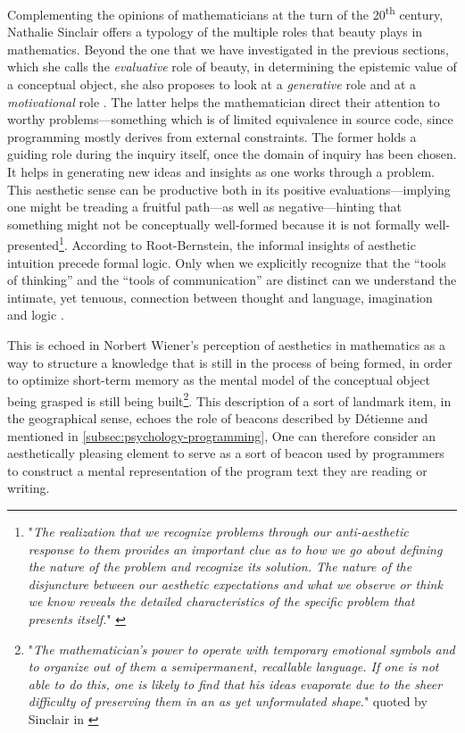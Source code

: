 Complementing the opinions of mathematicians at the turn of the 20\textsuperscript{th} century, Nathalie Sinclair offers a typology of the multiple roles that beauty plays in mathematics. Beyond the one that we have investigated in the previous sections, which she calls the \emph{evaluative} role of beauty, in determining the epistemic value of a conceptual object, she also proposes to look at a \emph{generative} role and at a \emph{motivational} role \citep{sinclair_aesthetic_2011}. The latter helps the mathematician direct their attention to worthy problems—something which is of limited equivalence in source code, since programming mostly derives from external constraints. The former holds a guiding role during the inquiry itself, once the domain of inquiry has been chosen. It helps in generating new ideas and insights as one works through a problem. This aesthetic sense can be productive both in its positive evaluations—implying one might be treading a fruitful path—as well as negative—hinting that something might not be conceptually well-formed because it is not formally well-presented\footnote{"\emph{The realization that we recognize problems through our anti-aesthetic response to them provides an important clue as to how we go about defining the nature of the problem and recognize its solution. The nature of the disjuncture between our aesthetic expectations and what we observe or think we know reveals the detailed characteristics of the specific problem that presents itself.}" \citep{root-bernstein_aesthetic_2002}}. According to Root-Bernstein, the informal insights of aesthetic intuition precede formal logic. Only when we explicitly recognize that the “tools of thinking” and the “tools of communication” are distinct can we understand the intimate, yet tenuous, connection between thought and language, imagination and logic \citep{root-bernstein_aesthetic_2002}.

This is echoed in Norbert Wiener's perception of aesthetics in mathematics as a way to structure a knowledge that is still in the process of being formed, in order to optimize short-term memory as the mental model of the conceptual object being grasped is still being built\footnote{"\emph{The mathematician's power to operate with temporary emotional symbols and to organize out of them a semipermanent, recallable language. If one is not able to do this, one is likely to find that his ideas evaporate due to the sheer difficulty of preserving them in an as yet unformulated shape.}" quoted by Sinclair in \citep{sinclair_roles_2004}}. This description of a sort of landmark item, in the geographical sense, echoes the role of beacons described by Détienne \citep{detienne_software_2001} and mentioned in \ref{subsec:psychology-programming}, One can therefore consider an aesthetically pleasing element to serve as a sort of beacon used by programmers to construct a mental representation of the program text they are reading or writing.

